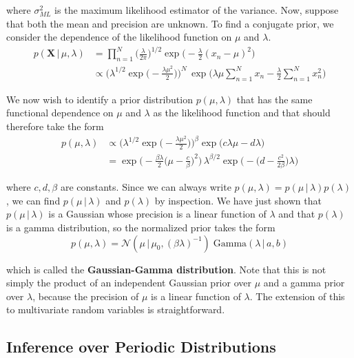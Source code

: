 \documentclass{article}
\begin{document}
    where $\sigma_{ML}^2$ is the maximum likelihood estimator of the variance. Now, suppose that both the mean and precision are unknown. To find a conjugate prior, we consider the dependence of the likelihood function on $\mu$ and $\lambda$.
    \begin{align*}
      p(\mathbf{X}\,|\,\mu, \lambda) & = \prod_{n=1}^N \bigg(\frac{\lambda}{2\pi}\bigg)^{1/2} \exp \bigg( -\frac{\lambda}{2} (x_n - \mu)^2 \bigg) \\
      & \propto \bigg(\lambda^{1/2} \exp \Big(-\frac{\lambda \mu^2}{2} \Big) \bigg)^N \, \exp \bigg( \lambda \mu \sum_{n=1}^N x_n - \frac{\lambda}{2} \sum_{n=1}^N x_n^2 \bigg)
    \end{align*}

    We now wish to identify a prior distribution $p(\mu, \lambda)$ that has the same functional dependence on $\mu$ and $\lambda$ as the likelihood function and that should therefore take the form
    \begin{align*}
      p(\mu, \lambda) & \propto \bigg( \lambda^{1/2} \exp \Big(-\frac{\lambda \mu^2}{2}\Big) \bigg)^\beta \exp\big( c \lambda \mu - d \lambda \big) \\
      & = \exp \bigg( -\frac{\beta \lambda}{2} \Big(\mu - \frac{c}{\beta} \Big)^2 \bigg) \, \lambda^{\beta/2} \exp \bigg(-\Big(d - \frac{c^2}{2\beta}\Big) \lambda \bigg)
    \end{align*}

    where $c, d, \beta$ are constants. Since we can always write $p(\mu, \lambda) = p(\mu\,|\,\lambda) p(\lambda)$, we can find $p(\mu\,|\,\lambda)$ and $p(\lambda)$ by inspection. We have just shown that $p(\mu \,|\, \lambda)$ is a Gaussian whose precision is a linear function of $\lambda$ and that $p(\lambda)$ is a gamma distribution, so the normalized prior takes the form
    \begin{equation}
      p(\mu, \lambda) = \mathcal{N}(\mu \,|\, \mu_0, (\beta\lambda)^{-1}) \; \text{Gamma}(\lambda\,|\,a, b)
    \end{equation}

    which is called the \textbf{Gaussian-Gamma distribution}. Note that this is not simply the product of an independent Gaussian prior over $\mu$ and a gamma prior over $\lambda$, because the precision of $\mu$ is a linear function of $\lambda$. The extension of this to multivariate random variables is straightforward.

  \subsection{Inference over Periodic Distributions}
\end{document}
